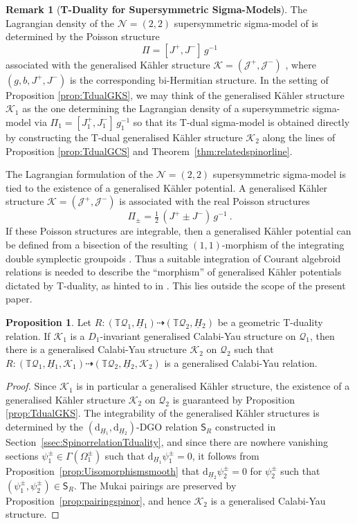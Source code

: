 \documentclass[a4paper, reqno, 11pt]{amsart}
\numberwithin{equation}{section}
\theoremstyle{definition}
\newtheorem{proposition}[equation]{Proposition}
\newtheorem{remark}[equation]{Remark}
\newcommand{\red}[1]{\underline{#1}}
\newcommand{\de}{\mathrm{d}}
\newcommand{\IT}{\mathbb{T}}
\newcommand{\cN}{{\mathcal N}}
\newcommand{\cQ}{{\mathcal Q}}
\newcommand{\cK}{{\mathcal K}}
\newcommand{\cJ}{{\mathcal J}}
\newcommand{\sfS}{{\mathsf{S}}}
\newcommand{\sfGamma}{{\mathsf{\Gamma}}}
\newcommand{\rel}{\dashrightarrow}
\theoremstyle{remark}
\begin{document}
\begin{remark}[\textbf{T-Duality for Supersymmetric Sigma-Models}]
    The Lagrangian density of the $\mathcal{N}=(2,2)$ supersymmetric sigma-model of \cite{Gates:1984nk} is determined by the Poisson structure $$\Pi = [J^+,J^-]\,g^{-1}$$  associated with the generalised K{\"a}hler structure $\cK = (\cJ^+, \cJ^-)$ \cite{Lindstrom:2005zr}, where $(g,b,J^+,J^-)$ is the corresponding bi-Hermitian structure. In the setting of Proposition \ref{prop:TdualGKS}, we may think of the generalised K{\"a}hler structure $\cK_1$ as the one determining the Lagrangian density of a supersymmetric sigma-model via $\Pi_1 = [J_1^+,J_1^-]\,g_1^{-1}$ so that its T-dual sigma-model is obtained directly by constructing the T-dual generalised K{\"a}hler structure $\cK_2$ along the lines of Proposition \ref{prop:TdualGCS} and Theorem~\ref{thm:relatedspinorline}. 
    
    The Lagrangian formulation of the $\cN=(2,2)$ supersymmetric sigma-model is tied to the existence of a generalised K{\"a}hler potential.
    A generalised K{\"a}hler structure $\cK=(\cJ^+, \cJ^-)$ is associated with the real Poisson structures $$\Pi_\pm = \tfrac{1}{2}\,(J^+ \pm J^-)\,g^{-1} \ . $$ If these Poisson structures are integrable, then a generalised K{\"a}hler potential can be defined from a bisection of the resulting $(1,1)$-morphism of the integrating double symplectic  groupoids \cite{Alvarez:2024wki}. Thus a suitable integration of Courant algebroid relations is needed to describe the ``morphism'' of generalised K{\"a}hler potentials dictated by T-duality, as hinted to in \cite{Alvarez:2024wki}. This lies outside the scope of the present paper. 
\end{remark}

\begin{proposition}\label{prop:TdualGCY}
    Let $R\colon (\IT \cQ_1,\red H{}_1) \rel (\IT \cQ_2,\red H{}_2)$ be a geometric T-duality relation. If $\cK_1$ is a $D_1$-invariant generalised Calabi-Yau structure on $\cQ_1$, then there is a generalised Calabi-Yau structure $\cK_2$ on $\cQ_2$ such that $R\colon (\IT \cQ_1, \red H{}_1, \cK_1) \rel (\IT \cQ_2, \red H{}_2, \cK_2)$ is a generalised Calabi-Yau relation.
\end{proposition}

\begin{proof}
    Since $\cK_1$ is in particular a generalised  K\"ahler structure, the existence of a generalised K\"ahler structure $\cK_2$ on $\cQ_2$ is guaranteed by Proposition \ref{prop:TdualGKS}. The integrability of the generalised K\"ahler structures is determined by the $(\de_{\red H{}_1}, \de_{\red H{}_2})$-DGO relation $\sfS_R$ constructed in Section~\ref{ssec:SpinorrelationTduality}, and since there are nowhere vanishing sections $\psi_1^\pm\in \sfGamma(\Omega_1^\pm)$ such that $\de_{\red H{}_1} \psi^\pm_1 = 0$, it follows from Proposition~\ref{prop:Uisomorphismsmooth} that $\de_{\red H{}_2}\psi^\pm_2 = 0$ for $\psi^\pm_2$ such that $(\psi^\pm_1, \psi^\pm_2) \in \sfS_R$. The Mukai pairings are preserved by Proposition~\ref{prop:pairingspinor},  and hence $\cK_2$ is a generalised Calabi-Yau structure.
\end{proof}
\end{document}
